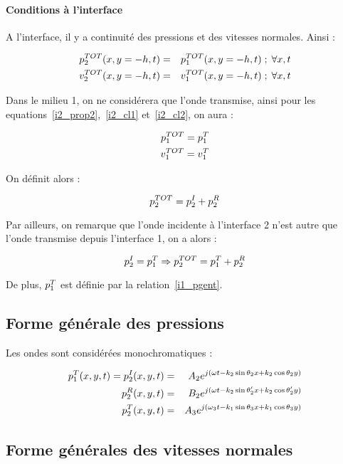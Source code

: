 \paragraph{Conditions à l'interface}

A l'interface, il y a continuité des pressions et des vitesses normales. Ainsi :

\begin{eqnarray}
    p^{TOT}_2(x, y=-h, t) &=& p^{TOT}_1(x,y=-h,t) \;;\;\forall x,t \label{i2_cl1}\\
    v^{TOT}_2(x, y=-h, t) &=& v^{TOT}_1(x,y=-h,t) \;;\;\forall x,t \label{i2_cl2}
\end{eqnarray}

Dans le milieu 1, on ne considérera que l'onde transmise, ainsi pour les equations~\eqref{i2_prop2},~\eqref{i2_cl1}
et~\eqref{i2_cl2}, on aura :

\begin{eqnarray*}
    p^{TOT}_1 = p^T_1\\
    v^{TOT}_1 = v^T_1
\end{eqnarray*}

On définit alors :

$$p^{TOT}_2 = p^I_2 + p^R_2$$

Par ailleurs, on remarque que l'onde incidente à l'interface 2 n'est autre que l'onde transmise depuis l'interface 1, on
a alors :

$$p^I_2 = p^T_1 \Rightarrow p^{TOT}_2 = p^T_1 + p^R_2$$

De plus, $p^T_1$ est définie par la relation~\eqref{i1_pgent}.

\subsection{Forme générale des pressions}

Les ondes sont considérées monochromatiques :

\begin{eqnarray}
    p^T_1(x,y,t) = p^I_2(x,y,t) & = & A_2e^{j(\omega t-k_2\sin\theta_2x+k_2\cos\theta_2y)} \label{i2_pgeni}\\
    p^R_2(x,y,t) & = & B_2e^{j(\omega t-k_2\sin\theta_2'x+k_2\cos\theta_2'y)} \label{i2_pgenr}\\
    p^T_2(x,y,t) & = & A_3e^{j(\omega_3t-k_1\sin\theta_3x+k_1\cos\theta_3y)} \label{i1_pgent}
\end{eqnarray}

\subsection{Forme générales des vitesses normales}

